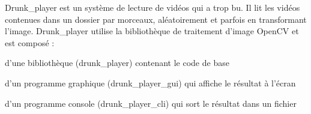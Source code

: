 Drunk\+\_\+player est un système de lecture de vidéos qui a trop bu. Il lit les vidéos contenues dans un dossier par morceaux, aléatoirement et parfois en transformant l'image. Drunk\+\_\+player utilise la bibliothèque de traitement d'image Open\+C\+V et est composé \+:


\begin{DoxyItemize}
\item d'une bibliothèque (drunk\+\_\+player) contenant le code de base
\item d'un programme graphique (drunk\+\_\+player\+\_\+gui) qui affiche le résultat à l'écran
\item d'un programme console (drunk\+\_\+player\+\_\+cli) qui sort le résultat dans un fichier 
\end{DoxyItemize}